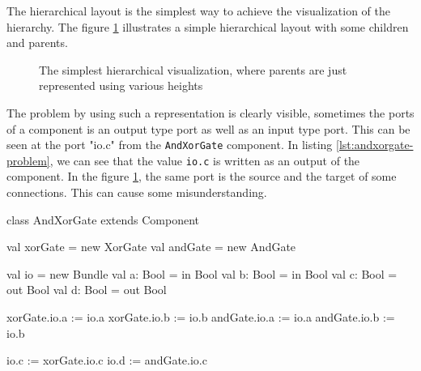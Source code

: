 The hierarchical layout is the simplest way to achieve the visualization of the
hierarchy. The figure \ref{fig:hierarchical-layout-simple} illustrates a simple
hierarchical layout with some children and parents.

\begin{figure}[H]
  \centering
  \caption[Simple hierarchical layout for diagram visualization]{The simplest
    hierarchical visualization, where parents are just represented using various
    heights}
  \label{fig:hierarchical-layout-simple}
\end{figure}

The problem by using such a representation is clearly visible, sometimes the
ports of a component is an output type port as well as an input type port.
This can be seen at the port "io.c" from the \texttt{AndXorGate} component. In
listing \ref{lst:andxorgate-problem}, we can see that the value \verb|io.c| is
written as an output of the component. In the figure
\ref{fig:hierarchical-layout-simple}, the same port is the source and the target
of some connections. This can cause some misunderstanding.

\begin{listing}[H]
  \centering
\begin{scalacode}
class AndXorGate extends Component {

  val xorGate = new XorGate
  val andGate = new AndGate

  val io = new Bundle {
    val a: Bool = in Bool
    val b: Bool = in Bool
    val c: Bool = out Bool
    val d: Bool = out Bool
  }

  xorGate.io.a := io.a
  xorGate.io.b := io.b
  andGate.io.a := io.a
  andGate.io.b := io.b

  io.c := xorGate.io.c
  io.d := andGate.io.c
}
\end{scalacode}
  \caption[The AndXorGate component written with SpinalHDL]{The AndXorGate
component written with SpinalHDL. We can see that the ``c'' port is an output
of the components and in figure \ref{fig:hierarchical-layout-simple} the port is
shown as an input port and as an output port.}
  \label{lst:andxorgate-problem}
\end{listing}

